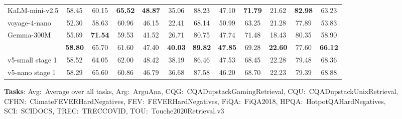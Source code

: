 \documentclass[11pt]{article}
\begin{document}
\begin{table}[H]
{\begin{tabular}{lccccccccccc}
KaLM-mini-v2.5 & 58.45 & 60.15 & \textbf{65.52} & \textbf{48.87} & 35.06 & 88.23 & 47.10 & \textbf{71.79} & 21.62 & \textbf{82.98} & 63.23 \\
voyage-4-nano & 52.30 & 58.63 & 60.96 & 46.15 & 22.41 & 68.14 & 50.99 & 63.25 & 21.28 & 77.89 & 53.83 \\
Gemma-300M & 55.69 & \textbf{71.54} & 59.53 & 41.52 & 26.71 & 80.75 & 47.74 & 71.48 & 18.43 & 80.35 & 58.90 \\
\JEmbeddingVFiveTextNanoShort{} & \textbf{58.80} & 65.70 & 61.60 & 47.40 & \textbf{40.03} & \textbf{89.82} & \textbf{47.85} & 69.28 & \textbf{22.60} & 77.60 & \textbf{66.12} \\
\midrule
v5-small stage 1 & 58.52 & 64.05 & 62.00 & 48.42 & 38.19 & 86.46 & 47.53 & 68.45 & 22.28 & 79.48 & 68.36 \\
v5-nano stage 1 & 58.29 & 65.60 & 60.86 & 46.79 & 36.68 & 87.58 & 46.20 & 68.70 & 22.23 & 79.39 & 68.88 \\
\bottomrule
\end{tabular}
}
\begin{flushleft}
\textbf{Tasks}: Avg:~Average over all tasks, Arg:~ArguAna, CQG:~CQADupstackGamingRetrieval, CQU:~CQADupstackUnixRetrieval, CFHN:~ClimateFEVERHardNegatives, FEV:~FEVERHardNegatives, FiQA:~FiQA2018, HPQA:~HotpotQAHardNegatives, SCI:~SCIDOCS, TREC:~TRECCOVID, TOU:~Touche2020Retrieval.v3
\end{flushleft}
\end{table}
\end{document}
